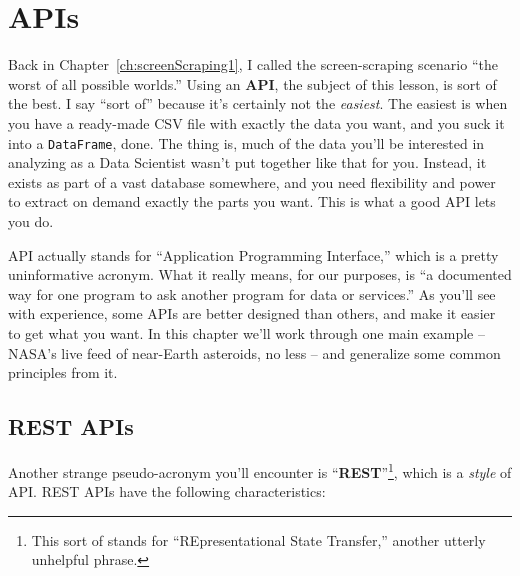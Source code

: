 \chapter{APIs}
\label{ch:api}


Back in Chapter~\ref{ch:screenScraping1}, I called the screen-scraping scenario
``the worst of all possible worlds.'' Using an \textbf{API}, the subject of
this lesson, is sort of the best. I say ``sort of'' because it's certainly not
the \textit{easiest}. The easiest is when you have a ready-made CSV file with
exactly the data you want, and you suck it into a \texttt{DataFrame}, done. The
thing is, much of the data you'll be interested in analyzing as a Data
Scientist wasn't put together like that for you. Instead, it exists as part of
a vast database somewhere, and you need flexibility and power to extract on
demand exactly the parts you want. This is what a good API lets you do.

API actually stands for ``Application Programming Interface,'' which is a
pretty uninformative acronym. What it really means, for our purposes, is ``a
documented way for one program to ask another program for data or services.''
As you'll see with experience, some APIs are better designed than others,
and make it easier to get what you want. In this chapter we'll work through one
main example -- NASA's live feed of near-Earth asteroids, no less -- and
generalize some common principles from it.

\section{REST APIs}

Another strange pseudo-acronym you'll encounter is
``\textbf{REST}''\footnote{This sort of stands for ``REpresentational State
Transfer,'' another utterly unhelpful phrase.}, which is a \textit{style} of
API. REST APIs have the following characteristics:

